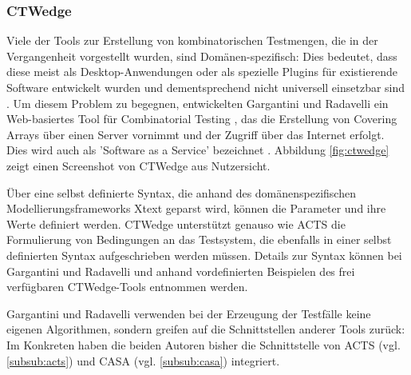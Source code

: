 \subsubsection{CTWedge}\label{subsub:ctwedge}

Viele der Tools zur Erstellung von kombinatorischen Testmengen, die in der Vergangenheit vorgestellt wurden, sind Domänen-spezifisch: Dies bedeutet, dass diese meist als Desktop-Anwendungen oder als spezielle Plugins für existierende Software entwickelt wurden und dementsprechend nicht universell einsetzbar sind \cite{gargantini2018migrating}. Um diesem Problem zu begegnen, entwickelten Gargantini und Radavelli \cite{gargantini2018migrating} ein Web-basiertes Tool für Combinatorial Testing \cite{ctwedge}, das die Erstellung von Covering Arrays über einen Server vornimmt und der Zugriff über das Internet erfolgt. Dies wird auch als 'Software as a Service' bezeichnet \cite{gargantini2018migrating}. Abbildung \ref{fig:ctwedge} zeigt einen Screenshot von CTWedge aus Nutzersicht.

Über eine selbst definierte Syntax, die anhand des domänenspezifischen Modellierungsframeworks Xtext \cite{eysholdt2010xtext} geparst wird, können die Parameter und ihre Werte definiert werden. CTWedge unterstützt genauso wie ACTS die Formulierung von Bedingungen an das Testsystem, die ebenfalls in einer selbst definierten Syntax aufgeschrieben werden müssen. Details zur Syntax können bei Gargantini und Radavelli \cite{gargantini2018migrating} und anhand vordefinierten Beispielen des frei verfügbaren CTWedge-Tools \cite{ctwedge} entnommen werden.

Gargantini und Radavelli verwenden bei der Erzeugung der Testfälle keine eigenen Algorithmen, sondern greifen auf die Schnittstellen anderer Tools zurück: Im Konkreten haben die beiden Autoren bisher die Schnittstelle von ACTS (vgl. \autoref{subsub:acts}) und CASA (vgl. \autoref{subsub:casa}) integriert.










